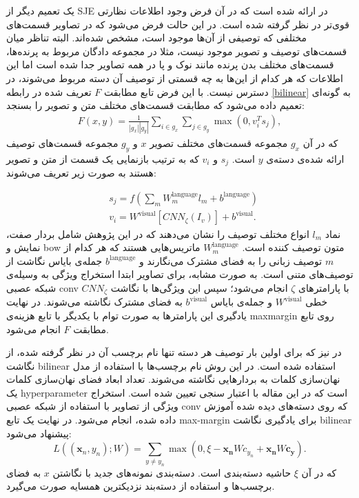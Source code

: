 یک تعمیم دیگر از SJE در \cite{multicue} ارائه شده است که در آن فرض وجود اطلاعات نظارتی قوی‌تر در نظر گرفته شده است.  در این حالت فرض می‌شود که در تصاویر قسمت‌های مختلفی که توصیفی از آن‌ها موجود است، مشخص شده‌اند. البته تناظر میان قسمت‌های توصیف و تصویر موجود نیست، مثلا در مجموعه دادگان مربوط به پرنده‌ها، قسمت‌های مختلف بدن پرنده مانند نوک و پا در همه تصاویر جدا شده است اما این اطلاعات که هر کدام از این‌ها به چه قسمتی از توصیف آن دسته مربوط می‌شوند، در دسترس نیست. با این فرض تابع مطابقت $F$ تعریف شده در رابطه \eqref{bilinear} به گونه‌ای تعمیم داده می‌شود که مطابقت قسمت‌های مختلف متن و تصویر را بسنجد:
\begin{align}
F(x,y) = \frac{1}{|g_x||g_y|} \sum_{i\in g_x}\sum_{j\in g_y} \max(0,v_i^Ts_j),
\end{align}
که در آن 
 $g_x$ 
 مجموعه قسمت‌های مختلف تصویر $x$ و  $g_y$ مجموعه قسمت‌های توصیف ارائه شده‌ی دسته‌ی $y$ است. $s_j$ و $v_i$ که به ترتیب بازنمایی یک قسمت از متن و تصویر هستند به صورت زیر تعریف می‌شوند:
 
\begin{align}
& s_j = f\left( \sum_m W^{\text{language}}_m l_m + b^{\text{language}} \right) \nonumber \\
& v_i = W^\text{visual} [CNN_{\zeta}(I_v)] + b^{\text{visual}}.
\end{align}
نماد
$l_m$
انواع مختلف توصیف را نشان می‌دهند که در این پژوهش شامل بردار صفت، نمایش   و \gls{bow}  متون توصیف کننده است.
$ W^{\text{language}}_m $
ماتریس‌هایی هستند که هر کدام از $m$ توصیف زبانی را به فضای مشترک می‌نگارند و $b^{\text{language}}$ جمله‌ی بایاس نگاشت از توصیف‌های متنی است. به صورت مشابه، برای تصاویر ابتدا استخراج ویژگی به وسیله‌ی شبکه عصبی \gls{conv} $CNN_{\zeta}$ با پارامترهای $\zeta$ انجام می‌شود؛ سپس این ویژگی‌ها با نگاشت خطی $W^\text{visual}$ و جمله‌ی بایاس $ b^{\text{visual}}$ به فضای مشترک نگاشته می‌شوند.  در نهایت یادگیری این پارامترها به صورت توام با یکدیگر با تابع هزینه‌ی \gls{maxmargin} روی تابع مطابقت $F$ انجام می‌شود.


در
\cite{devise}
نیز که برای اولین بار توصیف هر دسته تنها نام برچسب آن در نظر گرفته شده، از نگاشت \gls{bilinear} استفاده شده است. در این روش نام برچسب‌ها با استفاده از مدل نهان‌سازی کلمات  به بردارهایی نگاشته می‌شوند. تعداد ابعاد فضای نهان‌سازی کلمات یک \gls{hyperparameter} است که در این مقاله با اعتبار سنجی تعیین شده است. استخراج ویژگی از  تصاویر  با استفاده از شبکه عصبی \gls{conv}
\cite{alexnet}
که روی دسته‌های دیده شده آموزش داده شده، انجام می‌شود. در نهایت یک تابع \gls{max-margin}
برای یادگیری نگاشت \gls{bilinear} پیشنهاد می‌شود:
\begin{equation}
 L((\mathbf{x} _n, y_n);W) = \sum_{y\neq y_n} \max(0, \xi  - \mathbf{x_n} Wc_{y_n} + \mathbf{x_n} W\mathbf{c_y} ).
\end{equation}
که در آن $\xi$ حاشیه دسته‌بندی است. دسته‌بندی نمونه‌های جدید با نگاشتن $x$ به فضای برچسب‌ها و استفاده از دسته‌بند نزدیکترین همسایه صورت می‌گیرد.

